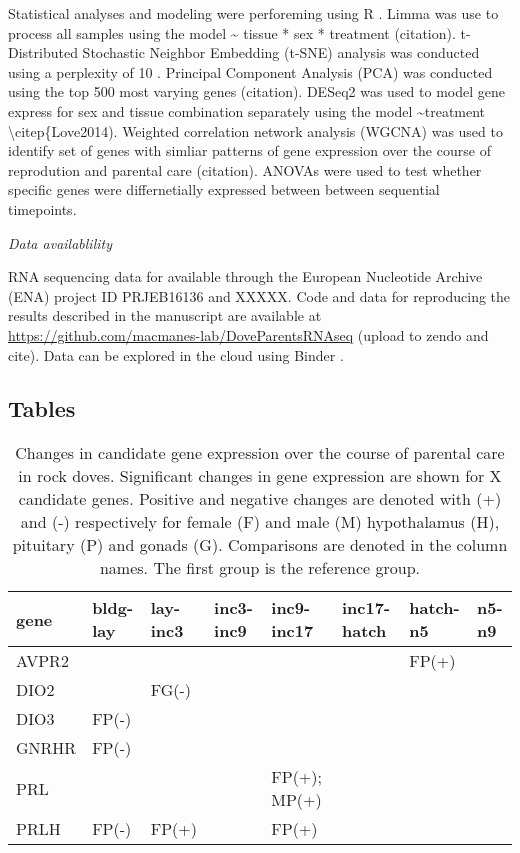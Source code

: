 Statistical analyses and modeling were perforeming using R
\citep{RDevelopmentCoreTeam2013, Wickham2016}. Limma was use to process
all samples using the model \textasciitilde{} tissue * sex * treatment
(citation). t-Distributed Stochastic Neighbor Embedding (t-SNE) analysis
was conducted using a perplexity of 10 \citep{VanDerMaaten2008}.
Principal Component Analysis (PCA) was conducted using the top 500 most
varying genes (citation). DESeq2 was used to model gene express for sex
and tissue combination separately using the model
\textasciitilde{}treatment \textbackslash{}citep\{Love2014). Weighted
correlation network analysis (WGCNA) was used to identify set of genes
with simliar patterns of gene expression over the course of reprodution
and parental care (citation). ANOVAs were used to test whether specific
genes were differnetially expressed between between sequential
timepoints.

\emph{Data availablility}

RNA sequencing data for available through the European Nucleotide
Archive (ENA) project ID PRJEB16136 and XXXXX. Code and data for
reproducing the results described in the manuscript are available at
\url{https://github.com/macmanes-lab/DoveParentsRNAseq} (upload to zendo
and cite). Data can be explored in the cloud using Binder
\citep{project_jupyter-proc-scipy-2018}.

\newpage

\hypertarget{tables}{%
\subsection{Tables}\label{tables}}

\begin{Schunk}
\begin{table}

\caption{\label{tab:table1}Changes in candidate gene expression over the course of parental care in rock doves. Significant changes in gene expression are shown for X candidate genes. Positive and negative changes are denoted with (+) and (-) respectively for female (F) and male (M) hypothalamus (H), pituitary (P) and gonads (G). Comparisons are denoted in the column names. The first group is the reference group.}
\centering
\begin{tabular}[t]{l|l|l|l|l|l|l|l}
\hline
gene & bldg-lay & lay-inc3 & inc3-inc9 & inc9-inc17 & inc17-hatch & hatch-n5 & n5-n9\\
\hline
AVPR2 &  &  &  &  &  & FP(+) & \\
\hline
DIO2 &  & FG(-) &  &  &  &  & \\
\hline
DIO3 & FP(-) &  &  &  &  &  & \\
\hline
GNRHR & FP(-) &  &  &  &  &  & \\
\hline
PRL &  &  &  & FP(+); MP(+) &  &  & \\
\hline
PRLH & FP(-) & FP(+) &  & FP(+) &  &  & \\
\hline
\end{tabular}
\end{table}

\end{Schunk}


